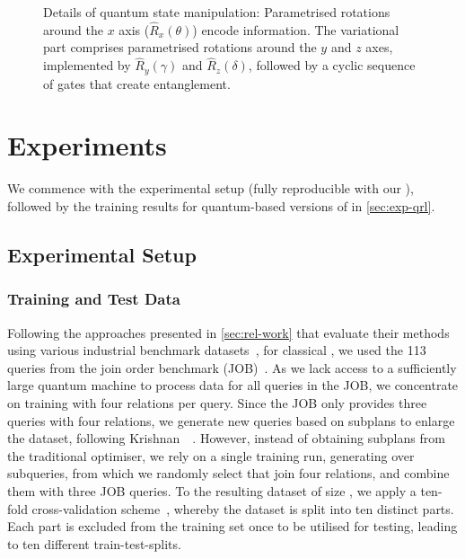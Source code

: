 \documentclass[10pt, conference]{IEEEtran}
\begin{document}
\begin{figure}[htb]
    \begin{center}
      \scriptsize{}
    \end{center}
    \vspace*{-1em}
    \caption{Details of quantum state manipulation: Parametrised 
    rotations around the \(x\) axis (\(\hat{R}_{x}(\theta)\)) 
    encode information. The 
    variational part comprises parametrised rotations around the \(y\) 
    and \(z\) axes, implemented by \(\hat{R}_{y}(\gamma)\) and \(\hat{R}_{z}
    (\delta)\), followed by a cyclic sequence of \CZgate gates that create entanglement.}\label{fig:vqc_detail}
\end{figure}


\section{Experiments}
\label{sec:exp}

We commence with the experimental setup
(fully reproducible with our \repro), followed by the training results for quantum-based versions of \rj in \autoref{sec:exp-qrl}.



\subsection{Experimental Setup}
\label{subsec:setup}

\subsubsection{Training and Test Data}
Following the approaches presented in \autoref{sec:rel-work} that evaluate their methods using various industrial benchmark datasets~\cite{leis15, poess02, poess10},
for classical \rj, we used the 113 queries from the join order benchmark (JOB)~\cite{leis15}.
As we lack access to a sufficiently large quantum machine to process data for all queries in the JOB, we concentrate on training with four relations per query.
Since the JOB only provides three queries with four relations, we generate new queries based on subplans to enlarge the dataset, following Krishnan~\etal~\cite{krishnan18}.
However, instead of obtaining subplans from the traditional optimiser, we rely on a single \rj training run, generating over  subqueries, from which we randomly select  that join four relations,
and combine them with three JOB queries.
To the resulting dataset of size , we apply a ten-fold cross-validation scheme~\cite{fushiki2011}, whereby the dataset is split into ten distinct parts.
Each part is excluded from the training set once to be utilised for testing, leading to ten different train-test-splits.
\end{document}
